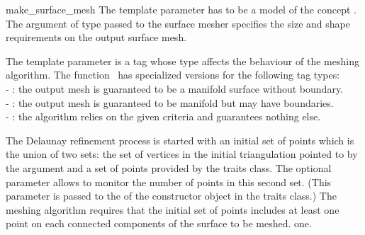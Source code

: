 \begin{ccRefFunction}{make_surface_mesh}
The template parameter  has to be a model
of the concept .
The argument of type   passed to the surface
mesher specifies the size and shape  requirements
on the output surface mesh.

The template parameter 
is a tag whose type affects the behaviour of the
meshing algorithm. The function \ccRefName\  has specialized versions
for the following  tag types: \\
- : the output mesh is guaranteed to be a manifold
surface without boundary.\\
- : the output mesh is guaranteed to be
manifold but may have boundaries.\\
- : the algorithm relies on the given criteria and
guarantees nothing else.



The Delaunay refinement
process is started with an initial set of points which is the union 
of two sets: the
set of vertices in the initial  triangulation pointed to by the
 argument   and a set of
points provided by the traits class.
The optional parameter  
allows to monitor the number of points in this second set.
(This parameter is passed to the  of 
the constructor object  
in the traits class.)
The meshing algorithm requires that the initial set of points
includes at least one point
on each connected components of the surface to be meshed.
one.


 



\ccSeeAlso
 \\
 \\
 \\
 \\
 \\







\end{ccRefFunction}


